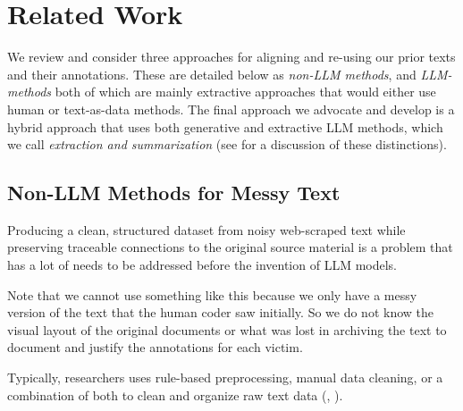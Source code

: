 \documentclass{article}
\begin{document}


\section{Related Work}\label{related-work}

We review and consider three approaches for aligning and re-using our prior texts and their annotations.  These are detailed below as \emph{non-LLM methods}, and \emph{LLM-methods} both of which are mainly extractive approaches that would either use human or text-as-data methods.  The final approach we advocate and develop is a hybrid approach that uses both generative and extractive LLM methods, which we call \emph{extraction and summarization} (see \cite{Brandt_etal2025} for a discussion of these distinctions). 

\subsection{Non-LLM Methods for Messy
Text}\label{non-llm-methods-for-messy-text}

Producing a clean, structured dataset from noisy web-scraped text while preserving traceable connections to the original source material is a problem that has a lot of needs to be addressed before the invention of LLM models.

Note that we cannot use something like this because we only have a messy version of the text that the human coder saw initially.  So we do not know the visual layout of the original documents or what was lost in archiving the text to document and justify the annotations for each victim.

Typically, researchers uses rule-based preprocessing, manual data cleaning, or a combination of both to clean and organize raw text data (\cite{Bohannon_etal2007}, \cite{OpenRefine2025}).
\end{document}
